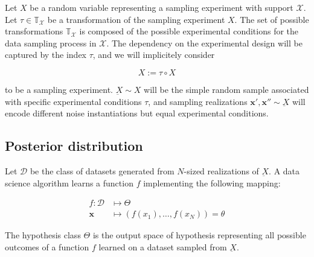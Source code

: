 \begin{definition}
    Let $X$ be a random variable representing a sampling experiment
    with support $\mathcal{X}$. Let $\tau \in \mathbb{T}_{\mathcal{X}}$ be a
    transformation of the sampling experiment $X$. The set of 
    possible transformations $\mathbb{T}_{\mathcal{X}}$ is composed
    of the possible experimental conditions for the data sampling 
    process in $\mathcal{X}$. The dependency on the 
    experimental design will be captured by the index $\tau$, 
    and we will implicitely consider 
    
    $$
        X := \tau \circ X
    $$

    to be a sampling experiment.  $\underbar{X} \sim X$ will be 
    the simple random sample associated with specific experimental
    conditions $\tau$, and sampling realizations 
    $\bm{x}', \bm{x}'' \sim \underbar{X}$ will encode different 
    noise instantiations but equal experimental conditions.
\end{definition}

\subsection{Posterior distribution}


\begin{definition}
    Let $\mathcal{D}$ be the class of datasets generated from $N$-sized realizations of $\underbar{X}$. 
    A data science algorithm learns a function $f$ implementing the following mapping:

    $$
    \begin{aligned}
        f: \mathcal{D} & \longmapsto \Theta \\
        \bm{x}  & \longmapsto (f(x_1), \dots, f(x_N)) = \theta
    \end{aligned}
    $$

    The hypothesis class $\Theta$ is the output space of hypothesis representing all 
    possible outcomes of a function $f$ learned on a dataset sampled from $\underbar{X}$.

\end{definition}

